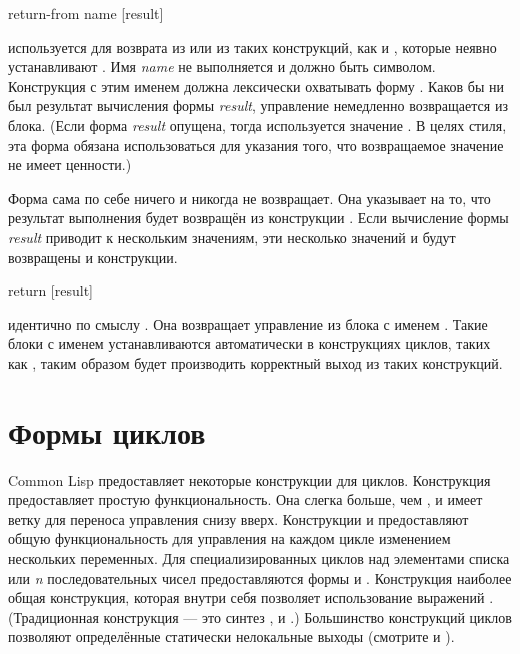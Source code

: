 \begin{defspec}
return-from name [result]

 используется для возврата из  или из таких
конструкций, как  и , которые неявно устанавливают
.
Имя \emph{name} не выполняется и должно быть символом.
Конструкция  с этим именем должна лексически охватывать форму
.
Каков бы ни был результат вычисления формы \emph{result}, управление немедленно
возвращается из блока.
(Если форма \emph{result} опущена, тогда используется значение {\nil}. В целях
стиля, эта форма обязана использоваться для указания того, что возвращаемое
значение не имеет ценности.)

Форма  сама по себе ничего и никогда не возвращает.
Она указывает на то, что результат выполнения будет возвращён из конструкции
.
Если вычисление формы \emph{result} приводит к нескольким значениям, эти
несколько значений и будут возвращены и конструкции.
\end{defspec}

\begin{defmac}
return [result]

 идентично по смыслу 
. Она возвращает управление из блока с
именем {\nil}.
Такие блоки с именем {\nil} устанавливаются автоматически в конструкциях циклов,
таких как , таким образом  будет производить корректный
выход из таких конструкций.
\end{defmac}

\section{Формы циклов}

Common Lisp предоставляет некоторые конструкции для циклов. Конструкция
 предоставляет простую функциональность. Она слегка больше, чем
, и имеет ветку для переноса управления снизу вверх.
Конструкции  и  предоставляют общую функциональность для
управления на каждом цикле изменением нескольких переменных.
Для специализированных циклов над элементами списка или \emph{n}
последовательных чисел предоставляются формы  и .
Конструкция  наиболее общая конструкция, которая внутри себя
позволяет использование выражений . (Традиционная конструкция 
--- это синтез ,  и .)
Большинство конструкций циклов позволяют определённые статически нелокальные
выходы (смотрите  и ).

